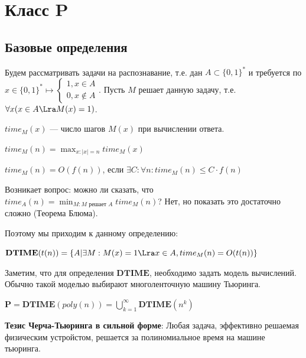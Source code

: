 

\section{Класс \(\mathbf{P}\)}

\subsection{Базовые определения}

Будем рассматривать задачи на распознавание, т.е. дан \(A \subset \{0, 1\}^*\) и требуется по \(x \in \{0, 1\}^* \mapsto \left\{\begin{array}{l}
    1, x \in A \\
    0, x \notin A
\end{array}\right.\). Пусть \(M\) решает данную задачу, т.е. \(\forall x (x \in A \Lra M(x) = 1)\).

\begin{definition}
    \(time_M(x)\) --- число шагов \(M(x)\) при вычислении ответа.
\end{definition}

\begin{definition}
    \(time_M(n) = \max_{x: |x| = n} time_M(x)\)
\end{definition}

\begin{definition}
    \(time_M(n) = O(f(n))\), если \(\exists C: \forall n: time_M(n) \le C \cdot f(n)\)
\end{definition}

Возникает вопрос: можно ли сказать, что \(time_A(n) = \min_{M: M \text{ решает }A} time_M(n)\)? Нет, но показать это достаточно сложно (Теорема Блюма).

Поэтому мы приходим к данному определению:
\begin{definition}
    \(\mathbf{DTIME}(t(n)) = \{A | \exists M: M(x) = 1 \Lra x \in A, time_M(n) = O(t(n))\}\)
\end{definition}

Заметим, что для определения \(\mathbf{DTIME}\), необходимо задать модель вычислений. Обычно такой моделью выбирают многоленточную машину Тьюринга.

\begin{definition}
    \(\mathbf{P} = \mathbf{DTIME}(poly(n)) = \bigcup_{k = 1}^\infty \mathbf{DTIME}(n^k)\)
\end{definition}

\textbf{Тезис Черча-Тьюринга в сильной форме}: Любая задача, эффективно решаемая физическим устройстом, решается за полиномиальное время на машине тьюринга.

